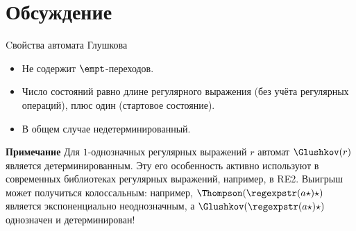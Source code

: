 \section{Обсуждение}
\begin{frame}{Cвойства автомата Глушкова}
  \begin{itemize}
    \item Не содержит $\empt$-переходов.
    \item Число состояний равно длине регулярного выражения (без учёта регулярных операций), плюс один (стартовое состояние).
    \item В общем случае недетерминированный.
  \end{itemize}

  \begin{alertblock}{\bf Примечание}
    Для $1$-однозначных регулярных выражений $r$ автомат $\Glushkov(r)$ является детерминированным. Эту его особенность активно используют в современных библиотеках регулярных выражений, например, в \textsc{RE2}. Выигрыш может получиться колоссальным: например, $\Thompson(\regexpstr(a\star)\star)$ является экспоненциально неоднозначным, а $\Glushkov(\regexpstr(a\star)\star)$ однозначен и детерминирован!
  \end{alertblock}%
\end{frame}



